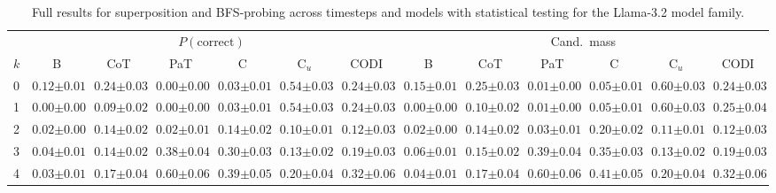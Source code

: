 \begin{table}[!t]
\begin{tabular}{l cccccc cccccc}
\midrule
 & \multicolumn{6}{c}{$P(\text{correct})$} & \multicolumn{6}{c}{Cand.\ mass} \\
\cmidrule(lr){2-7} \cmidrule(lr){8-13}
$k$ & B & CoT & PaT & C & C$_u$ & CODI & B & CoT & PaT & C & C$_u$ & CODI \\
\midrule
0 & $0.12 {\scriptstyle \pm 0.01}$ & $0.24 {\scriptstyle \pm 0.03}$ & $0.00 {\scriptstyle \pm 0.00}$ & $0.03 {\scriptstyle \pm 0.01}$ & $0.54 {\scriptstyle \pm 0.03}$ & $0.24 {\scriptstyle \pm 0.03}$ & $0.15 {\scriptstyle \pm 0.01}$ & $0.25 {\scriptstyle \pm 0.03}$ & $0.01 {\scriptstyle \pm 0.00}$ & $0.05 {\scriptstyle \pm 0.01}$ & $0.60 {\scriptstyle \pm 0.03}$ & $0.24 {\scriptstyle \pm 0.03}$ \\
1 & $0.00 {\scriptstyle \pm 0.00}$ & $0.09 {\scriptstyle \pm 0.02}$ & $0.00 {\scriptstyle \pm 0.00}$ & $0.03 {\scriptstyle \pm 0.01}$ & $0.54 {\scriptstyle \pm 0.03}$ & $0.24 {\scriptstyle \pm 0.03}$ & $0.00 {\scriptstyle \pm 0.00}$ & $0.10 {\scriptstyle \pm 0.02}$ & $0.01 {\scriptstyle \pm 0.00}$ & $0.05 {\scriptstyle \pm 0.01}$ & $0.60 {\scriptstyle \pm 0.03}$ & $0.25 {\scriptstyle \pm 0.04}$ \\
2 & $0.02 {\scriptstyle \pm 0.00}$ & $0.14 {\scriptstyle \pm 0.02}$ & $0.02 {\scriptstyle \pm 0.01}$ & $0.14 {\scriptstyle \pm 0.02}$ & $0.10 {\scriptstyle \pm 0.01}$ & $0.12 {\scriptstyle \pm 0.03}$ & $0.02 {\scriptstyle \pm 0.00}$ & $0.14 {\scriptstyle \pm 0.02}$ & $0.03 {\scriptstyle \pm 0.01}$ & $0.20 {\scriptstyle \pm 0.02}$ & $0.11 {\scriptstyle \pm 0.01}$ & $0.12 {\scriptstyle \pm 0.03}$ \\
3 & $0.04 {\scriptstyle \pm 0.01}$ & $0.14 {\scriptstyle \pm 0.02}$ & $0.38 {\scriptstyle \pm 0.04}$ & $0.30 {\scriptstyle \pm 0.03}$ & $0.13 {\scriptstyle \pm 0.02}$ & $0.19 {\scriptstyle \pm 0.03}$ & $0.06 {\scriptstyle \pm 0.01}$ & $0.15 {\scriptstyle \pm 0.02}$ & $0.39 {\scriptstyle \pm 0.04}$ & $0.35 {\scriptstyle \pm 0.03}$ & $0.13 {\scriptstyle \pm 0.02}$ & $0.19 {\scriptstyle \pm 0.03}$ \\
4 & $0.03 {\scriptstyle \pm 0.01}$ & $0.17 {\scriptstyle \pm 0.04}$ & $0.60 {\scriptstyle \pm 0.06}$ & $0.39 {\scriptstyle \pm 0.05}$ & $0.20 {\scriptstyle \pm 0.04}$ & $0.32 {\scriptstyle \pm 0.06}$ & $0.04 {\scriptstyle \pm 0.01}$ & $0.17 {\scriptstyle \pm 0.04}$ & $0.60 {\scriptstyle \pm 0.06}$ & $0.41 {\scriptstyle \pm 0.05}$ & $0.20 {\scriptstyle \pm 0.04}$ & $0.32 {\scriptstyle \pm 0.06}$ \\
\bottomrule
\end{tabular}
\caption{Full results for superposition and BFS-probing across timesteps and models with statistical testing for the Llama-3.2 model family.}
\label{tab:appendix_bfs_probing_llama}
\end{table}
